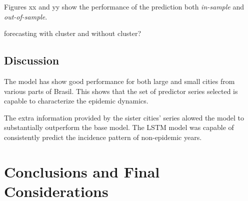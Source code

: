 \documentclass[12pt]{report}
\begin{document}
Figures xx and yy show the performance of the prediction  both \emph{in-sample} 
and  \emph{out-of-sample}.

forecasting with cluster and without cluster?

\section{Discussion}

The model has show good performance for both large and small cities from various parts of Brasil. This shows that the set of predictor series selected is capable to characterize the epidemic dynamics.

The extra information provided by the sister cities' series alowed the model to substantially outperform the base model. The LSTM model was capable of consistently predict the incidence pattern of non-epidemic years. 

\newpage
\chapter{Conclusions and Final Considerations}

\newpage
{}
{}



\newpage
{}
{}
\end{document}
